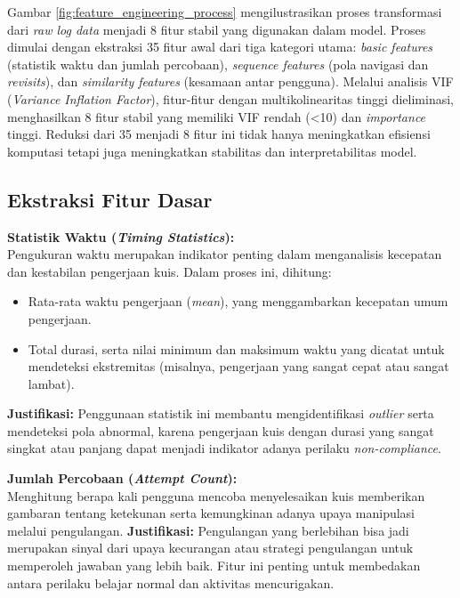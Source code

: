 Gambar \ref{fig:feature_engineering_process} mengilustrasikan proses transformasi dari \textit{raw log data} menjadi 8 fitur stabil yang digunakan dalam model. Proses dimulai dengan ekstraksi 35 fitur awal dari tiga kategori utama: \textit{basic features} (statistik waktu dan jumlah percobaan), \textit{sequence features} (pola navigasi dan \textit{revisits}), dan \textit{similarity features} (kesamaan antar pengguna). Melalui analisis VIF (\textit{Variance Inflation Factor}), fitur-fitur dengan multikolinearitas tinggi dieliminasi, menghasilkan 8 fitur stabil yang memiliki VIF rendah (<10) dan \textit{importance} tinggi. Reduksi dari 35 menjadi 8 fitur ini tidak hanya meningkatkan efisiensi komputasi tetapi juga meningkatkan stabilitas dan interpretabilitas model.

\subsection{Ekstraksi Fitur Dasar}
\label{sec:ekstraksiFiturDasar}
\textbf{Statistik Waktu (\textit{Timing Statistics}):} \\
Pengukuran waktu merupakan indikator penting dalam menganalisis kecepatan dan kestabilan pengerjaan kuis. Dalam proses ini, dihitung:
\begin{itemize}
    \item Rata-rata waktu pengerjaan (\textit{mean}), yang menggambarkan kecepatan umum pengerjaan.
    \item Total durasi, serta nilai minimum dan maksimum waktu yang dicatat untuk mendeteksi ekstremitas (misalnya, pengerjaan yang sangat cepat atau sangat lambat).
\end{itemize}
\textbf{Justifikasi:} Penggunaan statistik ini membantu mengidentifikasi \textit{outlier} serta mendeteksi pola abnormal, karena pengerjaan kuis dengan durasi yang sangat singkat atau panjang dapat menjadi indikator adanya perilaku \textit{non-compliance}.

\textbf{Jumlah Percobaan (\textit{Attempt Count}):} \\
Menghitung berapa kali pengguna mencoba menyelesaikan kuis memberikan gambaran tentang ketekunan serta kemungkinan adanya upaya manipulasi melalui pengulangan.
\textbf{Justifikasi:} Pengulangan yang berlebihan bisa jadi merupakan sinyal dari upaya kecurangan atau strategi pengulangan untuk memperoleh jawaban yang lebih baik. Fitur ini penting untuk membedakan antara perilaku belajar normal dan aktivitas mencurigakan.

